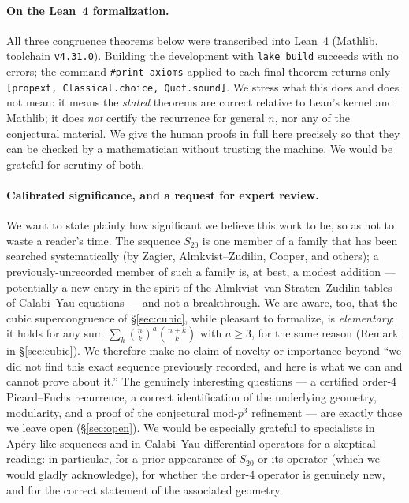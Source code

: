 \documentclass[11pt,a4paper]{article}
\theoremstyle{definition}
\theoremstyle{remark}
\newcommand{\Sx}{S_{20}}
\begin{document}
\paragraph{On the Lean~4 formalization.}
All three congruence theorems below were transcribed into Lean~4 (Mathlib,
toolchain \texttt{v4.31.0}).  Building the development with \texttt{lake build}
succeeds with no errors; the command \texttt{\#print axioms} applied to each
final theorem returns only \texttt{[propext, Classical.choice, Quot.sound]}.  We
stress what this does and does not mean: it means the \emph{stated} theorems are
correct relative to Lean's kernel and Mathlib; it does \emph{not} certify the
recurrence for general $n$, nor any of the conjectural material.  We give the
human proofs in full here precisely so that they can be checked by a
mathematician without trusting the machine.  We would be grateful for scrutiny
of both.

\paragraph{Calibrated significance, and a request for expert review.}
We want to state plainly how significant we believe this work to be, so as not
to waste a reader's time.  The sequence $\Sx$ is one member of a family that has
been searched systematically (by Zagier, Almkvist--Zudilin, Cooper, and others);
a previously-unrecorded member of such a family is, at best, a modest addition
--- potentially a new entry in the spirit of the Almkvist--van Straten--Zudilin
tables of Calabi--Yau equations --- and not a breakthrough.  We are aware, too,
that the cubic supercongruence of \S\ref{sec:cubic}, while pleasant to
formalize, is \emph{elementary}: it holds for any sum $\sum_k
\binom{n}{k}^{a}\binom{n+k}{k}$ with $a\ge 3$, for the same reason
(Remark in \S\ref{sec:cubic}).  We therefore make no claim of novelty or
importance beyond ``we did not find this exact sequence previously recorded, and
here is what we can and cannot prove about it.''  The genuinely interesting
questions --- a certified order-$4$ Picard--Fuchs recurrence, a correct
identification of the underlying geometry, modularity, and a proof of the
conjectural mod-$p^3$ refinement --- are exactly those we leave open
(\S\ref{sec:open}).  We would be especially grateful to specialists in
Ap\'ery-like sequences and in Calabi--Yau differential operators for a
skeptical reading: in particular, for a prior appearance of $\Sx$ or its
operator (which we would gladly acknowledge), for whether the order-$4$ operator
is genuinely new, and for the correct statement of the associated geometry.
\end{document}
